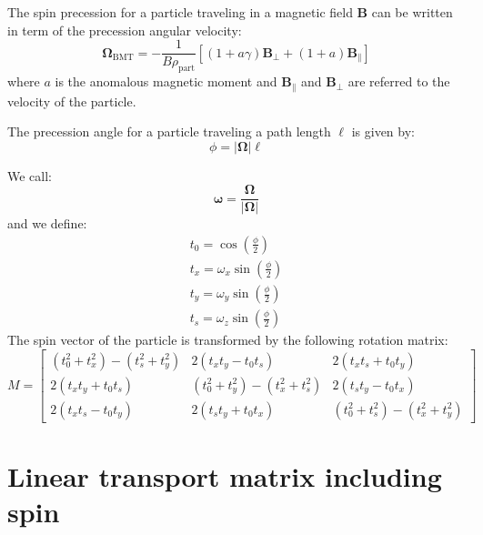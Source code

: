 The spin precession for a particle traveling in a magnetic field $\bm{B}$ can be written in term of the precession angular velocity:
\begin{equation}
\bm{\Omega}_{\text{BMT}} = -\frac{1}{B\rho_{\text{part}}} \left[ (1 + a \gamma)\bm{B}_{\perp} + (1 + a) \bm{B}_{\parallel} \right]
\end{equation}
where $a$ is the anomalous magnetic moment and $\bm{B}_{\parallel}$ and $\bm{B}_{\perp}$ are referred to the velocity of the particle.

The precession angle for a particle traveling a path length $\ell$ is given by:
\begin{equation}
\phi = |\bm\Omega| \ell
\end{equation}

We call:
\begin{equation}
\bm\omega = \frac{\bm\Omega}{|\bm\Omega|}
\end{equation}
and we define:
\begin{align}
t_0 = \cos\left(\frac{\phi}{2}\right)\\
t_x = \omega_x \sin\left(\frac{\phi}{2}\right)\\
t_y = \omega_y \sin\left(\frac{\phi}{2}\right)\\
t_s = \omega_z \sin\left(\frac{\phi}{2}\right)
\end{align}
The spin vector of the particle is transformed by the following rotation matrix:
\begin{equation}
M =
\begin{bmatrix}
(t_0^2 + t_x^2) - (t_s^2 + t_y^2) & 2(t_x t_y - t_0 t_s) & 2(t_x t_s + t_0 t_y) \\
2(t_x t_y + t_0 t_s) & (t_0^2 + t_y^2) - (t_x^2 + t_s^2) & 2(t_s t_y - t_0 t_x) \\
2(t_x t_s - t_0 t_y) & 2(t_s t_y + t_0 t_x) & (t_0^2 + t_s^2) - (t_x^2 + t_y^2)
\end{bmatrix}
\end{equation}


\section{Linear transport matrix including spin}

